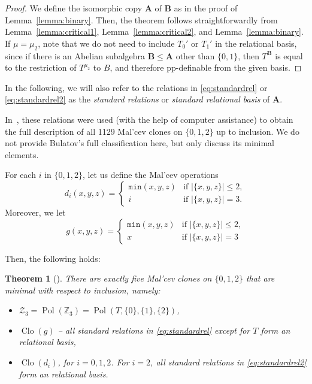 \documentclass[12pt]{amsart}
\newtheorem{theorem}{Theorem}[section]
\theoremstyle{definition}
\theoremstyle{definition}
\newcommand{\alg}[1]{\mathbf{#1}}
\newcommand{\algA}{\alg{A}}
\newcommand{\algB}{\alg{B}}
\DeclareMathOperator{\Pol}{Pol}
\DeclareMathOperator{\Clo}{Clo}
\newcommand{\minority}{\mathtt{min}}
\begin{document}
\begin{proof}
We define the isomorphic copy $\algA$ of $\algB$ as in the proof of Lemma~\ref{lemma:binary}. Then, the theorem follows straightforwardly from Lemma~\ref{lemma:critical1}, Lemma~\ref{lemma:critical2}, and Lemma~\ref{lemma:binary}. If $\mu = \mu_2$, note that we do not need to include $T_0'$ or $T_1'$ in the relational basis, since if there is an Abelian subalgebra $\algB \leq \algA$ other than $\{0,1\}$, then $T^\algB$ is equal to the restriction of $T^{\mu_2}$ to $B$, and therefore pp-definable from the given basis.
\end{proof}

In the following, we will also refer to the relations in \eqref{eq:standardrel} or \eqref{eq:standardrel2} as the \emph{standard relations} or \emph{standard relational basis} of $\algA$.

In~\cite{BulatovImportante}, these relations were used (with the help of computer assistance) to obtain the full description of all 1129 Mal'cev clones on $\{0,1,2\}$ up to inclusion. We do not provide Bulatov's full classification here, but only discuss its minimal elements.

For each $i$ in $\{0,1,2\}$, let us define the Mal'cev operations 
 \begin{equation}\label{equation:thed_ifunctions}
 d_i(x,y,z)=\begin{cases}
   \minority (x,y,z) & \text{if } |\{x, y, z\}|\leq 2,\\
   i & \text{if } |\{x, y, z\}|=3.
   \end{cases}
\end{equation}
Moreover, we let 
\begin{equation}\label{equation:minority_plu_porj}
 g(x,y,z)=\begin{cases}
   \minority (x,y,z) & \text{if } |\{x, y, z\}|\leq 2,\\
   x & \text{if } |\{x, y, z\}|=3
   \end{cases}
\end{equation}

Then, the following holds:

\begin{theorem}[{\cite[Corollary~3.5]{BulatovImportante}}] \label{thm:minimalclones}
There are exactly five Mal'cev clones on $\{0,1,2\}$ that are minimal with respect to inclusion, namely:
\begin{itemize}
\item $\mathcal Z_3 = \Pol(\mathbb Z_3) = \Pol(T,\{0\},\{1\},\{2\})$,
\item $\Clo(g)$ -- all standard relations in \eqref{eq:standardrel} except for $T$ form an relational basis,
\item $\Clo(d_i)$, for $i=0,1,2$. For $i=2$, all standard relations in \eqref{eq:standardrel2} form an relational basis.
\end{itemize}
\end{theorem}
\end{document}
